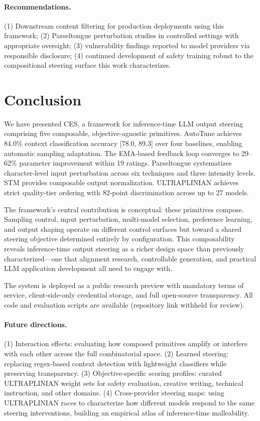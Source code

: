 \documentclass[11pt]{article}
\begin{document}
\paragraph{Recommendations.} (1) Downstream content filtering for production deployments using this framework; (2) Parseltongue perturbation studies in controlled settings with appropriate oversight; (3) vulnerability findings reported to model providers via responsible disclosure; (4) continued development of safety training robust to the compositional steering surface this work characterizes.

\section{Conclusion}

We have presented \textsc{CES}, a framework for inference-time LLM output steering comprising five composable, objective-agnostic primitives. AutoTune achieves 84.0\% context classification accuracy [78.0, 89.3] over four baselines, enabling automatic sampling adaptation. The EMA-based feedback loop converges to 29--62\% parameter improvement within 19 ratings. Parseltongue systematizes character-level input perturbation across six techniques and three intensity levels. STM provides composable output normalization. ULTRAPLINIAN achieves strict quality-tier ordering with 82-point discrimination across up to 27 models.

The framework's central contribution is conceptual: these primitives compose. Sampling control, input perturbation, multi-model selection, preference learning, and output shaping operate on different control surfaces but toward a shared steering objective determined entirely by configuration. This composability reveals inference-time output steering as a richer design space than previously characterized---one that alignment research, controllable generation, and practical LLM application development all need to engage with.

The system is deployed as a public research preview with mandatory terms of service, client-side-only credential storage, and full open-source transparency. All code and evaluation scripts are available (repository link withheld for review).

\paragraph{Future directions.} (1) Interaction effects: evaluating how composed primitives amplify or interfere with each other across the full combinatorial space. (2) Learned steering: replacing regex-based context detection with lightweight classifiers while preserving transparency. (3) Objective-specific scoring profiles: curated ULTRAPLINIAN weight sets for safety evaluation, creative writing, technical instruction, and other domains. (4) Cross-provider steering maps: using ULTRAPLINIAN races to characterize how different models respond to the same steering interventions, building an empirical atlas of inference-time malleability.
\end{document}
